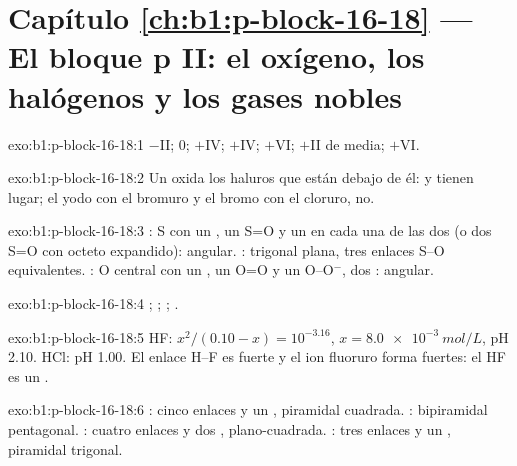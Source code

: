 \section*{Capítulo \ref{ch:b1:p-block-16-18} --- El bloque p II: el oxígeno, los halógenos y los gases nobles}

\begin{solution}{exo:b1:p-block-16-18:1}
 $-$II;  0;  $+$IV;  $+$IV; 
$+$VI;  $+$II de media;  $+$VI.
\end{solution}

\begin{solution}{exo:b1:p-block-16-18:2}
Un  oxida los haluros que están debajo de él:
 y  tienen lugar;
el yodo con el bromuro y el bromo con el cloruro, no.
\end{solution}

\begin{solution}{exo:b1:p-block-16-18:3}
: S con un , un S=O y un  en cada una
de las dos  (o dos S=O con octeto expandido): angular.
: trigonal plana, tres enlaces S--O equivalentes. : O
central con un , un O=O y un O--O$^-$, dos : angular.
\end{solution}

\begin{solution}{exo:b1:p-block-16-18:4}
; ;
; .
\end{solution}

\begin{solution}{exo:b1:p-block-16-18:5}
HF: $x^2/(0.10 - x) = 10^{-3.16}$, $x = \qty{8.0e-3}{mol/L}$, pH 2.10. HCl:
pH 1.00. El enlace H--F es fuerte y el ion fluoruro forma  fuertes: el HF es un .
\end{solution}

\begin{solution}{exo:b1:p-block-16-18:6}
: cinco enlaces y un , piramidal cuadrada.
: bipiramidal pentagonal. : cuatro enlaces y dos , plano-cuadrada. : tres enlaces y un , piramidal trigonal.
\end{solution}

